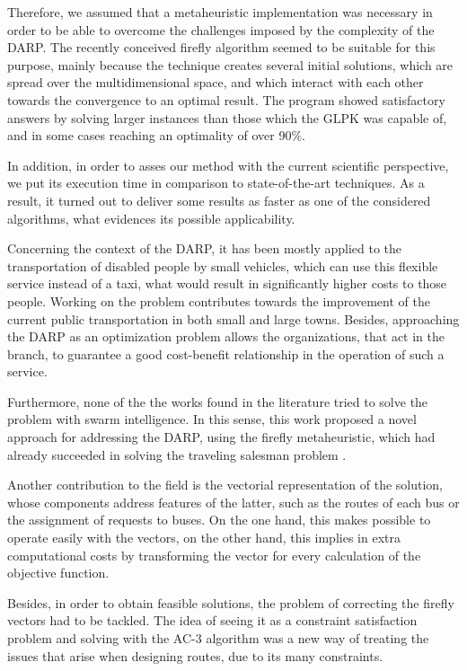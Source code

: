 \documentclass[tuberlin,cic,tc,openright,english,noabntcite,oneside]{iiufrgs}
\begin{document}
Therefore, we assumed that a metaheuristic implementation was necessary in order to be able to overcome the challenges imposed by the complexity of the DARP. The recently conceived firefly algorithm seemed to be suitable for this purpose, mainly because the technique creates several initial solutions, which are spread over the multidimensional space, and which interact with each other towards the convergence to an optimal result. The program showed satisfactory answers by solving larger instances than those which the GLPK was capable of, and in some cases reaching an optimality of over 90\%.

In addition, in order to asses our method with the current scientific perspective, we put its execution time in comparison to state-of-the-art techniques. As a result, it turned out to deliver some results as faster as one of the considered algorithms, what evidences its possible applicability.

Concerning the context of the DARP, it has been mostly applied to the transportation of disabled people by small vehicles, which can use this flexible service instead of a taxi, what would result in significantly higher costs to those people. Working on the problem contributes towards the improvement of the current public transportation in both small and large towns. Besides, approaching the DARP as an optimization problem allows the organizations, that act in the branch, to guarantee a good cost-benefit relationship in the operation of such a service.

Furthermore, none of the the works found in the literature tried to solve the problem with swarm intelligence. In this sense, this work proposed a novel approach for addressing the DARP, using the firefly metaheuristic, which had already succeeded in solving the traveling salesman problem \parencite{jati_evolutionary_2011}.

Another contribution to the field is the vectorial representation of the solution, whose components address features of the latter, such as the routes of each bus or the assignment of requests to buses. On the one hand, this makes possible to operate easily with the vectors, on the other hand, this implies in extra computational costs by transforming the vector for every calculation of the objective function.

Besides, in order to obtain feasible solutions, the problem of correcting the firefly vectors had to be tackled. The idea of seeing it as a constraint satisfaction problem and solving with the AC-3 algorithm was a new way of treating the issues that arise when designing routes, due to its many constraints.
\end{document}
